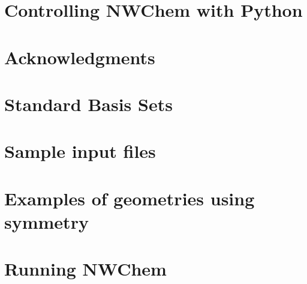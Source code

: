 \chapter{Controlling NWChem with Python}


\clearpage
\chapter{Acknowledgments}

\clearpage

\appendix

\chapter{Standard Basis Sets}


\chapter{Sample input files}


\chapter{Examples of geometries using symmetry}


\chapter{Running NWChem}



